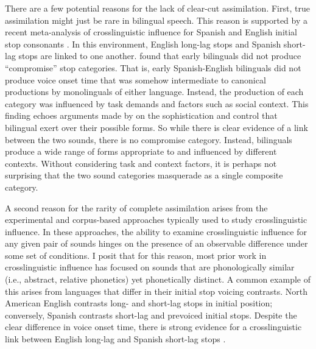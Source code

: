 There are a few potential reasons for the lack of clear-cut assimilation. First, true assimilation might just be rare in bilingual speech. This reason is supported by a recent meta-analysis of crosslinguistic influence for Spanish and English initial stop consonants \citep{casillas_2021_interlingual}. In this environment, English long-lag stops and Spanish short-lag stops are linked to one another. \citeauthor{casillas_2021_interlingual} found that early bilinguals did not produce ``compromise'' stop categories. That is, early Spanish-English bilinguals did not produce voice onset time that was somehow intermediate to canonical productions by monolinguals of either language. Instead, the production of each category was influenced by task demands and factors such as social context. This finding echoes arguments made by \citet{bullock_2009_sociophonetics} on the sophistication and control that bilingual exert over their possible forms. So while there is clear evidence of a link between the two sounds, there is no compromise category. Instead, bilinguals produce a wide range of forms appropriate to and influenced by different contexts. Without considering task and context factors, it is perhaps not surprising that the two sound categories masquerade as a single composite category. 

A second reason for the rarity of complete assimilation arises from the experimental and corpus-based approaches typically used to study crosslinguistic influence. In these approaches, the ability to examine crosslinguistic influence for any given pair of sounds hinges on the presence of an observable difference under some set of conditions. I posit that for this reason, most prior work in crosslinguistic influence has focused on sounds that are phonologically similar (i.e., abstract, relative phonetics) yet phonetically distinct. A common example of this arises from languages that differ in their initial stop voicing contrasts. North American English contrasts long- and short-lag stops in initial position; conversely, Spanish contrasts short-lag and prevoiced initial stops. Despite the clear difference in voice onset time, there is strong evidence for a crosslinguistic link between English long-lag and Spanish short-lag stops \citep{casillas_2021_interlingual, fricke_2016_phonetic, goldrick_2014_switching, bullock_2009_sociophonetics, olson_2016_transfer}. 

